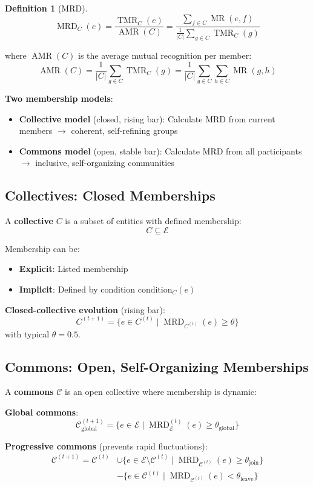 \documentclass[11pt,a4paper]{article}
\theoremstyle{definition}
\newtheorem{definition}[theorem]{Definition}
\theoremstyle{remark}
\newcommand{\E}{\mathcal{E}}
\newcommand{\C}{\mathcal{C}}
\DeclareMathOperator{\TMR}{TMR}
\DeclareMathOperator{\MR}{MR}
\DeclareMathOperator{\MRD}{MRD}
\DeclareMathOperator{\AMR}{AMR}
\begin{document}
\begin{definition}[MRD]
\[ \MRD_C(e) = \frac{\TMR_C(e)}{\AMR(C)} = \frac{\sum_{f \in C} \MR(e,f)}{\frac{1}{|C|}\sum_{g \in C} \TMR_C(g)} \]
\end{definition}

where $\AMR(C)$ is the average mutual recognition per member:
\[ \AMR(C) = \frac{1}{|C|} \sum_{g \in C} \TMR_C(g) = \frac{1}{|C|} \sum_{g \in C} \sum_{h \in C} \MR(g,h) \]

\textbf{Two membership models}:
\begin{itemize}
\item \textbf{Collective model} (closed, rising bar): Calculate MRD from current members $\rightarrow$ coherent, self-refining groups
\item \textbf{Commons model} (open, stable bar): Calculate MRD from all participants $\rightarrow$ inclusive, self-organizing communities
\end{itemize}

\subsection{Collectives: Closed Memberships}

A \textbf{collective} $C$ is a subset of entities with defined membership:
\[ C \subseteq \E \]

Membership can be:
\begin{itemize}
\item \textbf{Explicit}: Listed membership
\item \textbf{Implicit}: Defined by condition $\text{condition}_C(e)$
\end{itemize}

\textbf{Closed-collective evolution} (rising bar):
\[ C^{(t+1)} = \{ e \in C^{(t)} \mid \MRD_{C^{(t)}}(e) \ge \theta \} \]
with typical $\theta = 0.5$.

\subsection{Commons: Open, Self-Organizing Memberships}

A \textbf{commons} $\C$ is an open collective where membership is dynamic:

\textbf{Global commons}:
\[ \C_{\text{global}}^{(t+1)} = \{ e \in \E \mid \MRD_\E^{(t)}(e) \ge \theta_{\text{global}} \} \]

\textbf{Progressive commons} (prevents rapid fluctuations):
\begin{align*}
\C^{(t+1)} = \C^{(t)} &\cup \{ e \in \E \setminus \C^{(t)} \mid \MRD_{\C^{(t)}}(e) \ge \theta_{\text{join}} \} \\
&- \{ e \in \C^{(t)} \mid \MRD_{\C^{(t)}}(e) < \theta_{\text{leave}} \}
\end{align*}
\end{document}
